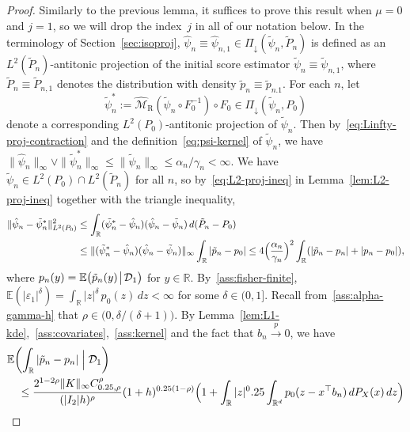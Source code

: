 \documentclass[a4paper]{article}
\newcommand{\R}{\mathbb{R}}
\newcommand{\E}{\mathbb{E}}
\newcommand{\norm}[1]{\|{#1}\|}
\newcommand{\cvp}{\overset{p}{\to}}
\theoremstyle{definition}
\begin{document}
\begin{proof}
Similarly to the previous lemma, it suffices to prove this result when $\mu = 0$ and $j = 1$, so we will drop the index~$j$ in all of our notation below. In the terminology of Section~\ref{sec:isoproj}, $\hat{\psi}_n \equiv \hat{\psi}_{n,1} \in \Pi_\downarrow(\tilde{\psi}_n, \tilde{P}_n)$ is defined as an $L^2(\tilde{P}_n)$-antitonic projection of the initial score estimator $\tilde{\psi}_n \equiv \tilde{\psi}_{n,1}$, where $\tilde{P}_n \equiv \tilde{P}_{n,1}$ denotes the distribution with density $\tilde{p}_n \equiv \tilde{p}_{n.1}$. For each $n$, let 
\[
\tilde{\psi}_n^* := \widehat{\mathcal{M}}_\mathrm{R}(\tilde{\psi}_n \circ F_0^{-1}) \circ F_0 \in \Pi_\downarrow(\tilde{\psi}_n, P_0)
\]
denote a corresponding $L^2(P_0)$-antitonic projection of $\tilde{\psi}_n$. Then by~\eqref{eq:Linfty-proj-contraction}
and the definition~\eqref{eq:psi-kernel} of $\tilde{\psi}_n$, we have $\norm{\hat{\psi}_n}_\infty \vee \norm{\tilde{\psi}_n^*}_\infty \leq \norm{\tilde{\psi}_n}_\infty \leq \alpha_n/\gamma_n < \infty$. We have $\tilde{\psi}_n \in L^2(P_0) \cap L^2(\tilde{P}_n)$ for all $n$, so by~\eqref{eq:L2-proj-ineq} in Lemma~\ref{lem:L2-proj-ineq} together with the triangle inequality,
\begin{align}
\norm{\hat{\psi}_n - \tilde{\psi}_n^*}_{L^2(P_0)}^2 &\leq \int_\R (\tilde{\psi}_n^* - \hat{\psi}_n)(\hat{\psi}_n - \tilde{\psi}_n)\,d(\tilde{P}_n - P_0) \notag \\
\label{eq:iso-kernel-crude-bd}
&\leq \norm{(\tilde{\psi}_n^* - \hat{\psi}_n)(\hat{\psi}_n - \tilde{\psi}_n)}_\infty \int_\R |\tilde{p}_n - p_0| \leq 4\Bigl(\frac{\alpha_n}{\gamma_n}\Bigr)^2 \int_\R (|\tilde{p}_n - p_n| + |p_n - p_0|),
\end{align}
where $p_n(y) = \E\bigl(\tilde{p}_n(y)\!\bigm|\!\mathcal{D}_1\bigr)$ for $y \in \R$. By~\ref{ass:fisher-finite}, $\E(|\varepsilon_1|^\delta) = \int_\R |z|^\delta\,p_0(z)\,dz < \infty$ for some $\delta \in (0,1]$. Recall from~\ref{ass:alpha-gamma-h} that $\rho \in \bigl(0,\delta/(\delta + 1)\bigr)$. By Lemma~\ref{lem:L1-kde},~\ref{ass:covariates},~\ref{ass:kernel} and the fact that $b_n \cvp 0$, we have
\begin{align*}
&\E\biggl(\int_\R |\tilde{p}_n - p_n| \Bigm| \mathcal{D}_1\biggr) \\
&\quad\leq \frac{2^{1 - 2\rho} \norm{K}_\infty C_{\delta,\rho}^\rho}{(|I_2|h)^\rho}(1 + h)^{\delta(1 - \rho)}\Bigl(1 + \int_\R |z|^\delta \int_{\R^d} p_0(z - x^\top b_n)\,dP_X(x)\,dz\Bigr) \\

\end{align*}
\end{proof}
\end{document}
